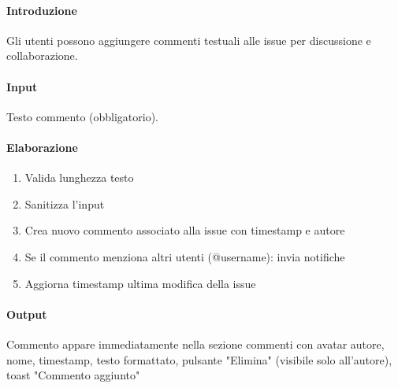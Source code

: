 \begin{reqbox}[title=REQ-FUN-18: Aggiungi Commento]
\label{subsubsec:req-aggiungi-commento}

\paragraph{Introduzione}
Gli utenti possono aggiungere commenti testuali alle issue per discussione e collaborazione.

\paragraph{Input}
Testo commento (obbligatorio).

\paragraph{Elaborazione}
\begin{enumerate}[leftmargin=1.1em]
\item Valida lunghezza testo
\item Sanitizza l'input
\item Crea nuovo commento associato alla issue con timestamp e autore
\item Se il commento menziona altri utenti (@username): invia notifiche
\item Aggiorna timestamp ultima modifica della issue
\end{enumerate}

\paragraph{Output}
Commento appare immediatamente nella sezione commenti con avatar autore, nome, timestamp, testo formattato, pulsante "Elimina" (visibile solo all'autore), toast "Commento aggiunto"

\end{reqbox}

\vspace{0.5cm}

\newpage


